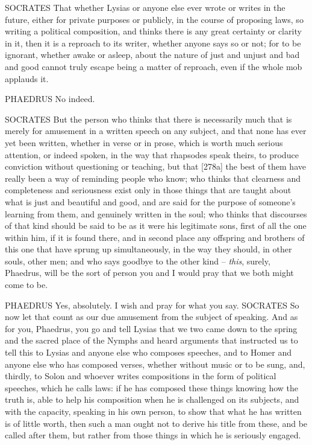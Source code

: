 SOCRATES That whether Lysias or anyone else ever wrote or writes in the
future, either for private purposes or publicly, in the course of
proposing laws, so writing a political composition, and thinks there is
any great certainty or clarity in it, then it is  a reproach to
its writer, whether anyone says so or not; for to  be ignorant,
whether awake or asleep, about the nature of just and unjust and bad and
good cannot truly escape being a matter of reproach, even if the whole
mob applauds it.

PHAEDRUS No indeed.

 SOCRATES But the person who thinks that there is necessarily
much that is merely for amusement in a written speech on any subject,
and that none has ever yet been written, whether in verse or in prose,
which is worth much serious attention, or indeed spoken, in the way that
rhapsodes speak theirs,
to produce conviction without questioning or teaching, but that
{[}278a{]} the best of them have really been a way of reminding people
who know; who thinks that clearness and completeness and seriousness
exist only in those things that are taught about what is just and
beautiful and good, and are said for the purpose of  someone's
learning from them, and genuinely written in the soul; who thinks that
discourses of that kind
should be said to be as it were his legitimate sons, first of all the
one within  him, if it is found there, and in second place any
offspring and brothers of this one that have sprung up simultaneously,
in the way they should, in other souls, other men; and who says goodbye
to the other kind -- {\em this}, surely, Phaedrus, will be the sort of
person you and I would pray that we both might come to be.

 PHAEDRUS Yes, absolutely. I wish and pray for what you say.
SOCRATES So now let that count as our due amusement from the subject of
speaking. And as for you, Phaedrus, you go and tell Lysias that we two
came down to the spring and the sacred  place of the Nymphs and
heard arguments that
instructed us to tell this to Lysias and anyone else who composes
speeches, and to Homer and anyone else who has composed verses, whether
without music or to be sung, and, thirdly, to Solon and whoever writes
compositions in the form of political speeches,  which he calls
laws: if he has composed these things knowing how the truth is, able to
help his composition when he is challenged on its subjects, and with the
capacity, speaking in his own person, to show that what he has written
is of little worth, then
such a man ought not to derive his title from these, and be called after
them, but rather from those things in  which he is seriously
engaged.


